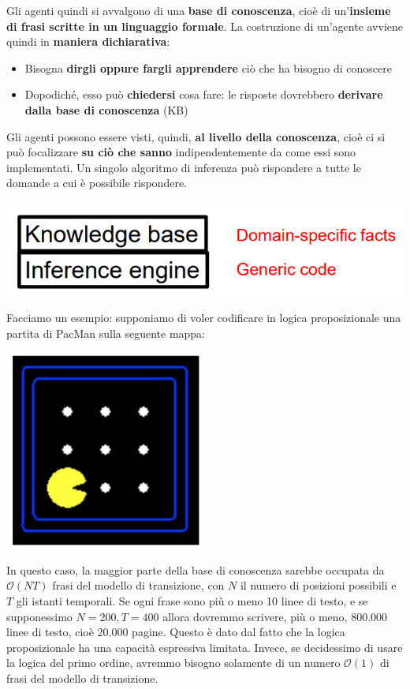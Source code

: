 \documentclass[12pt]{article}
\begin{document}
Gli agenti quindi si avvalgono di una \textbf{base di conoscenza}, cioè di un'\textbf{insieme di frasi scritte in un linguaggio formale}.
La costruzione di un'agente avviene quindi in \textbf{maniera dichiarativa}:
\begin{itemize}
    \item Bisogna \textbf{dirgli oppure fargli apprendere} ciò che ha bisogno di conoscere
    \item Dopodiché, esso può \textbf{chiedersi} cosa fare: le risposte dovrebbero \textbf{derivare dalla base di conoscenza} (KB) 
\end{itemize}
Gli agenti possono essere visti, quindi, \textbf{al livello della conoscenza}, cioè ci si può focalizzare \textbf{su ciò che sanno} indipendentemente da come essi sono implementati.
Un singolo algoritmo di inferenza può rispondere a tutte le domande a cui è possibile rispondere.
\begin{center}
    \includegraphics[width =0.60\linewidth]{Images/50.PNG}
\end{center}
Facciamo un esempio: supponiamo di voler codificare in logica proposizionale una partita di PacMan sulla seguente mappa:
\begin{center}
    \includegraphics[width =0.30\linewidth]{Images/51.PNG}
\end{center}
In questo caso, la maggior parte della base di conoscenza sarebbe occupata da $\mathcal{O}(NT)$ frasi del modello di transizione, con $N$ il numero
di posizioni possibili e $T$ gli istanti temporali. Se ogni frase sono più o meno 10 linee di testo, e se supponessimo $N = 200, T = 400$ allora dovremmo scrivere, più o meno,
800.000 linee di testo, cioè 20.000 pagine.
Questo è dato dal fatto che la logica proposizionale ha una capacità espressiva limitata.
Invece, se decidessimo di usare la logica del primo ordine, avremmo bisogno solamente di un numero $\mathcal{O}(1)$ di frasi del modello di transizione.
\end{document}
